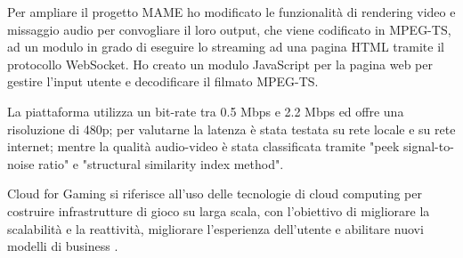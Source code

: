 Per ampliare il progetto MAME ho modificato le funzionalità di rendering video e missaggio audio per convogliare il loro output, che viene codificato in MPEG-TS, ad un modulo in grado di eseguire lo streaming ad una pagina HTML tramite il protocollo WebSocket. Ho creato un modulo JavaScript per la pagina web per gestire l'input utente e decodificare il filmato MPEG-TS.

La piattaforma utilizza un bit-rate tra 0.5 Mbps e 2.2 Mbps ed offre una risoluzione di 480p; per valutarne la latenza è stata testata su rete locale e su rete internet; mentre la qualità audio-video è stata classificata tramite "peek signal-to-noise ratio" e "structural similarity index method".





Cloud for Gaming si riferisce all'uso delle tecnologie di cloud computing per costruire infrastrutture di gioco su larga scala, con l'obiettivo di migliorare la scalabilità e la reattività, migliorare l'esperienza dell'utente e abilitare nuovi modelli di business \parencite{Cloud_for_Gaming}.

